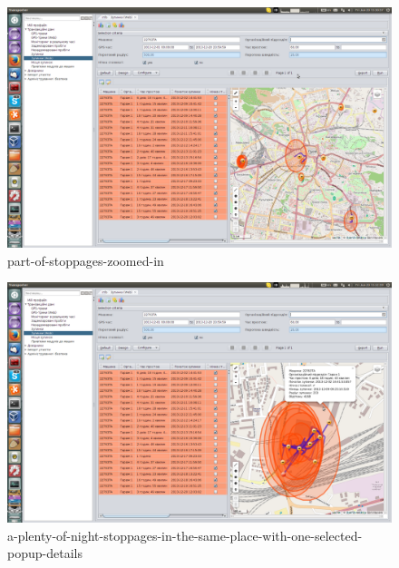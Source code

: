 \begin{figure}[!htp]
\centering
\includegraphics[width=16cm]{chapters/03-stoppages/images/23-part-of-stoppages-zoomed-in.png}
\caption{part-of-stoppages-zoomed-in}\label{fig:23}
\end{figure}

\begin{figure}[!htp]
\centering
\includegraphics[width=16cm]{chapters/03-stoppages/images/24-a-plenty-of-night-stoppages-in-the-same-place-with-one-selected-popup-details.png}
\caption{a-plenty-of-night-stoppages-in-the-same-place-with-one-selected-popup-details}\label{fig:24}
\end{figure}

